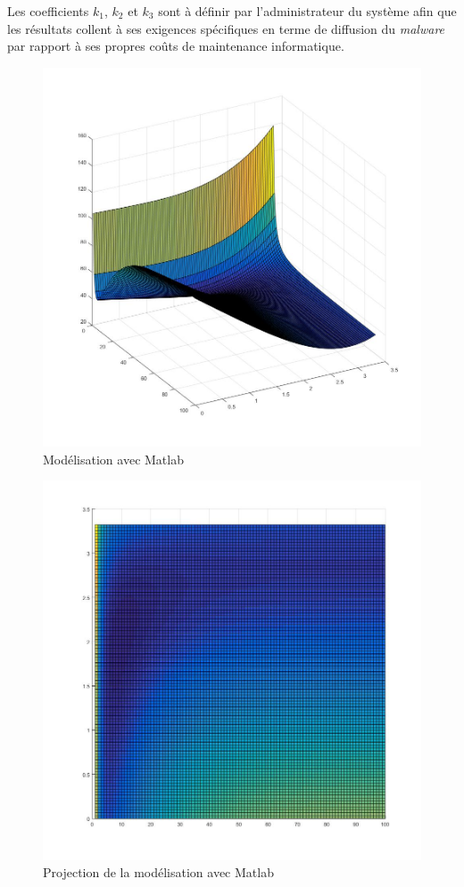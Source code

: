Les coefficients $k_1$, $k_2$ et $k_3$ sont à définir par l'administrateur du système afin que les résultats collent à ses exigences spécifiques en terme de diffusion du \textit{malware} par rapport à ses propres coûts de maintenance informatique.

\begin{figure}[!ht]
\centering
     \includegraphics[width=1.0\linewidth]{Paul/Matlab/3D.jpg}
     \caption{Modélisation avec Matlab}
     \label{matlab}
\end{figure}

\begin{figure}[!ht]
\centering
     \includegraphics[width=1.0\linewidth]{Paul/Matlab/3D_proj.jpg}
     \caption{Projection de la modélisation avec Matlab}
     \label{matlab_proj}
\end{figure}

